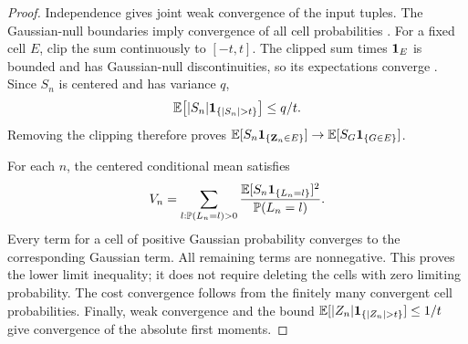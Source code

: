 \begin{proof}
Independence gives joint weak convergence of the input tuples.  The
Gaussian-null boundaries imply convergence of all cell probabilities
\cite[Theorem~3.10.1(v)]{Durrett}.
For a fixed cell $E$, clip the sum continuously to $[-t,t]$.
The clipped sum times $\mathbf 1_E$ is bounded and has Gaussian-null
discontinuities, so its expectations converge
\cite[Theorem~3.10.1(vi)]{Durrett}.  Since $S_n$ is centered
and has variance $q$,
\[
 \E\bigl[|S_n|\one_{\{|S_n|>t\}}\bigr]\le q/t.
\]
Removing the clipping therefore proves
$\mathbb E[S_n\mathbf 1_{\{\mathbf Z_n\in E\}}]\to
\mathbb E[S_G\mathbf 1_{\{G\in E\}}]$.

For each $n$, the centered conditional mean satisfies
\[
 V_n=\sum_{l:\mathbb P(L_n=l)>0}
 \frac{\mathbb E[S_n\mathbf 1_{\{L_n=l\}}]^2}{\mathbb P(L_n=l)}.
\]
Every term for a cell of positive Gaussian probability converges to
the corresponding Gaussian term.  All remaining terms are
nonnegative.  This proves the lower limit inequality; it does not
require deleting the cells with zero limiting probability.
The cost convergence follows from the finitely many convergent cell
probabilities.  Finally, weak convergence and the bound
$\E[|Z_n|\one_{\{|Z_n|>t\}}]\le1/t$ give convergence of the
absolute first moments.
\end{proof}

